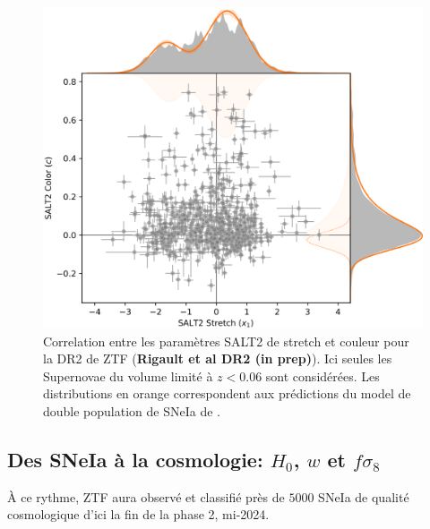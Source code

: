 \documentclass[../main/main.tex]{subfiles}
\begin{document}
\begin{figure}[ht]
  \centering
  \includegraphics[width=1\textwidth]{../figures/02_ztf/ztfdr2stretchcolorcorrelation.png}
  \caption[Correlation entre les paramètres SALT2 de stretch et couleur
  (ZTF-DR2)]{ Correlation entre les paramètres SALT2 de stretch et
    couleur pour la DR2 de ZTF (\textbf{Rigault et al DR2 (in prep)}). Ici seules les Supernovae du
    volume limité à $z<0.06$ sont considérées. Les distributions en
    orange correspondent aux prédictions du model de double population
    de SNeIa de \citet{NoraNicolas21}.}
  \label{fig:ztfdr2saltcorr}
\end{figure}



\subsection{Des SNeIa à la cosmologie: $H_{0}$, $w$ et $f\sigma_{8}$} \label{sec:sniaztfcosmo}

À ce rythme, ZTF aura observé et classifié près de $5000$ SNeIa de
qualité cosmologique d'ici la
fin de la phase 2, mi-2024.



\end{document}
